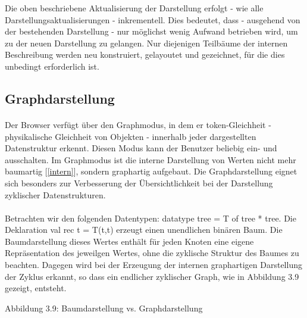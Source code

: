 \documentclass[12pt,a4paper]{article}
\begin{document}
Die oben beschriebene Aktualisierung der Darstellung erfolgt -
wie alle Darstellungsaktualisierungen - inkrementell. 
Dies bedeutet, dass - ausgehend  von der bestehenden Darstellung - 
nur m\"oglichst wenig Aufwand betrieben wird, um zu 
der neuen Darstellung zu gelangen. Nur diejenigen Teilb\"aume 
der internen Beschreibung werden neu konstruiert, gelayoutet und 
gezeichnet, f\"ur die dies unbedingt erforderlich ist. 


\subsection{Graphdarstellung}

\paragraph{}

Der Browser verf\"ugt \"uber den Graphmodus, in dem er token-Gleichheit -
physikalische Gleichheit von Objekten - innerhalb jeder dargestellten
Datenstruktur erkennt. Diesen Modus kann der Benutzer beliebig ein- und
ausschalten. Im Graphmodus ist die interne Darstellung von Werten 
nicht mehr baumartig [\ref{intern}], sondern graphartig aufgebaut.
Die Graphdarstellung eignet sich besonders zur Verbesserung der
\"Ubersichtlichkeit bei der Darstellung zyklischer Datenstrukturen. 

\paragraph{}

Betrachten wir den folgenden Datentypen: \newline
datatype tree = T of tree * tree. \newline
Die Deklaration \newline
 val rec t = T(t,t)  \newline
erzeugt einen unendlichen bin\"aren Baum. 
Die Baumdarstellung dieses Wertes 
enth\"alt f\"ur jeden Knoten  
eine eigene Repr\"asentation des jeweilgen Wertes, 
ohne die zyklische Struktur des Baumes zu beachten. 
Dagegen wird bei der Erzeugung der internen graphartigen
Darstellung der Zyklus erkannt, so dass ein endlicher zyklischer
Graph, wie in Abbildung 3.9 gezeigt, entsteht. 

\begin{center}
\linebreak 
Abbildung 3.9: Baumdarstellung vs. Graphdarstellung
\end{center}
\end{document}
